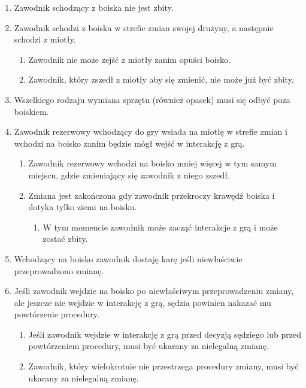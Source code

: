 \documentclass[11pt,a4paper]{article}
\begin{document}
\begin{enumerate}

\item
  Zawodnik schodzący z boiska nie jest zbity.
\item
  Zawodnik schodzi z boiska w strefie zmian swojej drużyny, a następnie
  schodzi z miotły.

  \begin{enumerate}
  
  \item
    Zawodnik nie może zejść z miotły zanim opuści boisko.
  \item
    Zawodnik, który zszedł z miotły aby się zmienić, nie może już być
    zbity.
  \end{enumerate}
\item
  Wszelkiego rodzaju wymiana sprzętu (również opasek) musi się odbyć
  poza boiskiem.
\item
  Zawodnik rezerwowy wchodzący do gry wsiada na miotłę w strefie zmian i
  wchodzi na boisko zanim będzie mógł wejść w interakcję z grą.

  \begin{enumerate}
  
  \item
    Zawodnik rezerwowy wchodzi na boisko mniej więcej w tym samym
    miejscu, gdzie zmieniający się zawodnik z niego zszedł.
  \item
    Zmiana jest zakończona gdy zawodnik przekroczy krawędź boiska i
    dotyka tylko ziemi na boisku.

    \begin{enumerate}
    
    \item
      W tym momencie zawodnik może zacząć interakcje z grą i może zostać
      zbity.
    \end{enumerate}
  \end{enumerate}
\item
  Wchodzący na boisko zawodnik dostaję karę jeśli niewłaściwie
  przeprowadzono zmianę.
\item
  Jeśli zawodnik wejdzie na boisko po niewłaściwym przeprowadzeniu
  zmiany, ale jeszcze nie wejdzie w interakcję z grą, sędzia powinien
  nakazać mu powtórzenie procedury.

  \begin{enumerate}
  
  \item
    Jeśli zawodnik wejdzie w interakcję z grą przed decyzją sędziego lub
    przed powtórzeniem procedury, musi być ukarany za nielegalną zmianę.
  \item
    Zawodnik, który wielokrotnie nie przestrzega procedury zmiany, musi
    być ukarany za nielegalną zmianę.
  \end{enumerate}
\end{enumerate}
\end{document}
